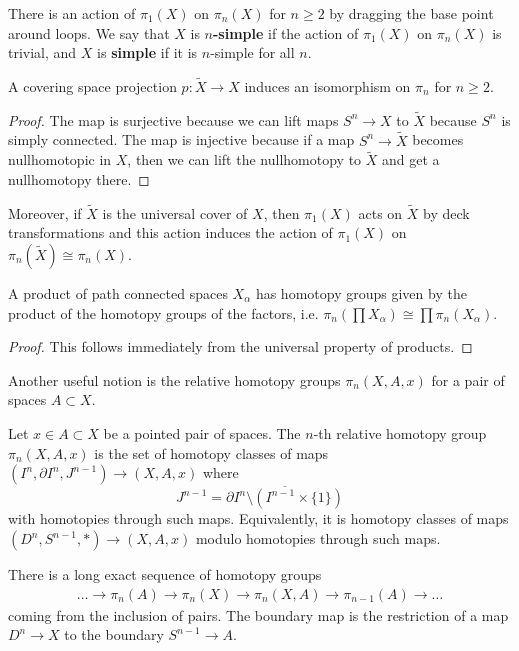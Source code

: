 \documentclass[12pt]{article}
\begin{document}
There is an action of $\pi_1(X)$ on $\pi_n(X)$ for $n\geq 2$ by dragging the base point around loops. We say that $X$ is \textbf{$n$-simple} if the action of $\pi_1(X)$ on $\pi_n(X)$ is trivial, and $X$ is \textbf{simple} if it is $n$-simple for all $n$. 

\begin{proposition}
    A covering space projection $p: \tilde X \to X$ induces an isomorphism on $\pi_n$ for $n\geq 2$.
\end{proposition}

\begin{proof}
    The map is surjective because we can lift maps $S^n \to X$ to $\tilde X$ because $S^n$ is simply connected. The map is injective because if a map $S^n \to \tilde X$ becomes nullhomotopic in $X$, then we can lift the nullhomotopy to $\tilde X$ and get a nullhomotopy there.
\end{proof}

Moreover, if $\tilde X$ is the universal cover of $X$, then $\pi_1(X)$ acts on $\tilde X$ by deck transformations and this action induces the action of $\pi_1(X)$ on $\pi_n(\tilde X) \cong \pi_n(X)$. 

\begin{proposition}
    A product of path connected spaces $X_\alpha$ has homotopy groups given by the product of the homotopy groups of the factors, i.e. $\pi_n(\prod X_\alpha) \cong \prod \pi_n(X_\alpha)$.
\end{proposition}

\begin{proof}
This follows immediately from the universal property of products. 
\end{proof}

Another useful notion is the relative homotopy groups $\pi_n(X,A,x)$ for a pair of spaces $A \subset X$. \begin{definition}
Let $x\in A \subset X$ be a pointed pair of spaces. The $n$-th relative homotopy group $\pi_n(X,A,x)$ is the set
    of homotopy classes of maps $(I^n, \partial I^n,J^{n-1}) \to (X,A,x)$ where \[J^{n-1}=\overline{\partial I^n\setminus (I^{n-1}\times\{1\})}\] with homotopies through such maps. Equivalently, it is homotopy classes of maps $(D^n, S^{n-1}, *) \to (X,A,x)$ modulo homotopies through such maps. 
\end{definition}

\begin{theorem}
    There is a long exact sequence of homotopy groups \begin{align*}
    \dots \to \pi_n(A) \to \pi_n(X) \to \pi_n(X,A) \to \pi_{n-1}(A) \to \dots
    \end{align*} coming from the inclusion of pairs. The boundary map is the restriction of a map $D^n \to X$ to the boundary $S^{n-1} \to A$.
\end{theorem}
\end{document}
